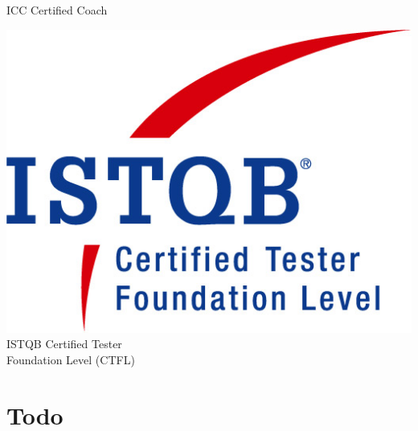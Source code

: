 \documentclass[11pt,a4paper,sans]{moderncv}
\begin{document}
{\begin{minipage}[t]{0.3\linewidth}
    \scriptsize ICC Certified Coach
  \end{minipage}
  \hfill
  \begin{minipage}[t]{0.3\linewidth}
    \centering
    \includegraphics[width=0.6\linewidth]{./images/ISQTB.jpg}\\
    \scriptsize ISTQB Certified Tester \\
    Foundation Level (CTFL)
  \end{minipage}
  \hfill
}

 













\section{Todo}
\end{document}
